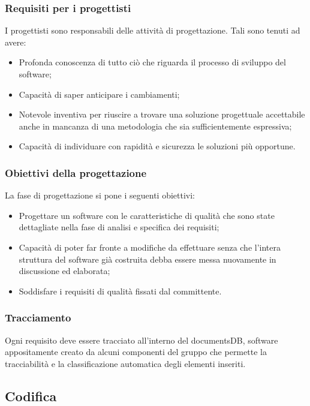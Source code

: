 \subsubsection{Requisiti per i progettisti}

I progettisti sono responsabili delle attività di progettazione. Tali sono tenuti ad avere:
\begin{itemize} 
\item
Profonda conoscenza di tutto ciò che riguarda il processo di sviluppo del software;
\item
Capacità di saper anticipare i cambiamenti;
\item
Notevole inventiva per riuscire a trovare una soluzione progettuale accettabile anche in mancanza di una metodologia che sia sufficientemente espressiva;
\item
Capacità di individuare con rapidità e sicurezza le soluzioni più opportune.
\end{itemize}

\subsubsection{Obiettivi della progettazione}
La fase di progettazione si pone i seguenti obiettivi:
\begin{itemize} 
\item
Progettare un software con le caratteristiche di qualità che sono state dettagliate nella fase di analisi e specifica dei requisiti;
\item
Capacità di poter far fronte a modifiche da effettuare senza che l'intera struttura del software già costruita debba essere messa nuovamente in discussione ed elaborata;
\item
Soddisfare i requisiti di qualità fissati dal committente.
\end{itemize}

\subsubsection{Tracciamento}
Ogni requisito deve essere tracciato all'interno del documentsDB, software
appositamente creato da alcuni componenti del gruppo che permette la tracciabilità e la classificazione automatica degli elementi inseriti.

\subsection{Codifica}

